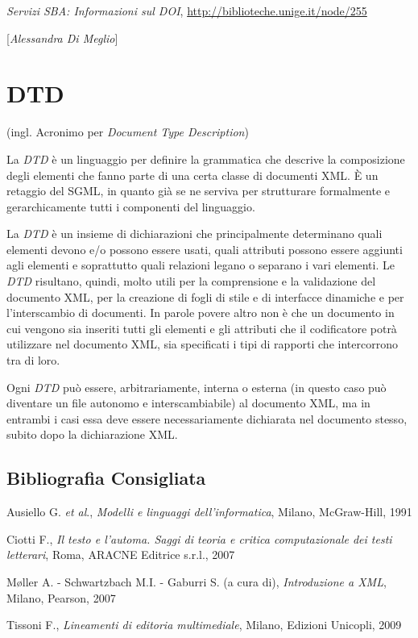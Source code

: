 {{{\emph{Servizi SBA: Informazioni sul DOI},
\url{http://biblioteche.unige.it/node/255}
}

\hrulefill 

{[}\emph{Alessandra Di Meglio}{]}

\chapter{DTD}

(ingl. Acronimo per \emph{Document Type Description})

La \emph{DTD} è un linguaggio per definire la grammatica che descrive la
composizione degli elementi che fanno parte di una certa classe di
documenti XML. È un retaggio del SGML, in quanto già se ne serviva per
strutturare formalmente e gerarchicamente tutti i componenti del
linguaggio.

La \emph{DTD} è un insieme di dichiarazioni che principalmente
determinano quali elementi devono e/o possono essere usati, quali
attributi possono essere aggiunti agli elementi e soprattutto quali
relazioni legano o separano i vari elementi. Le \emph{DTD} risultano,
quindi, molto utili per la comprensione e la validazione del documento
XML, per la creazione di fogli di stile e di interfacce dinamiche e per
l'interscambio di documenti. In parole povere altro non è che un
documento in cui vengono sia inseriti tutti gli elementi e gli attributi
che il codificatore potrà utilizzare nel documento XML, sia specificati
i tipi di rapporti che intercorrono tra di loro.

Ogni \emph{DTD} può essere, arbitrariamente, interna o esterna (in
questo caso può diventare un file autonomo e interscambiabile) al
documento XML, ma in entrambi i casi essa deve essere necessariamente
dichiarata nel documento stesso, subito dopo la dichiarazione XML.

\section*{Bibliografia Consigliata}
{\parindent0pt 
Ausiello G. \emph{et al}., \emph{Modelli e linguaggi dell'informatica},
Milano, McGraw-Hill, 1991

Ciotti F., \emph{Il testo e l'automa. Saggi di teoria e critica
computazionale dei testi letterari}, Roma, ARACNE Editrice s.r.l., 2007

Møller A. - Schwartzbach M.I. - Gaburri S. (a cura di),
\emph{Introduzione a XML}, Milano, Pearson, 2007

Tissoni F., \emph{Lineamenti di editoria multimediale}, Milano, Edizioni
Unicopli, 2009
}

}}
